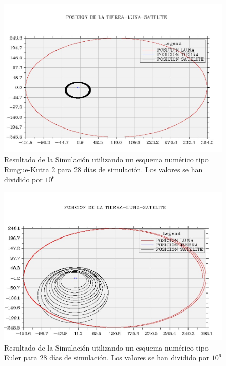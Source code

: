\documentclass[11pt,singlespacing,liststotoc,headsepline,a4paper]{article}
\begin{document}
\begin{figure}[H]
	\centering
	\includegraphics[width=1\textwidth]{TLS28D_RG2.jpg}
	\caption{Resultado de la Simulación utilizando un esquema numérico tipo Rungue-Kutta 2 para 28 días de simulación.  Los valores se han dividido por $10^{6}$}
	\label{TLS28D_RG2}
\end{figure}

\begin{figure}[H]
	\centering
	\includegraphics[width=1\textwidth]{TLS28D_EU.jpg}
	\caption{Resultado de la Simulación utilizando un esquema numérico tipo Euler para 28 días de simulación.  Los valores se han dividido por $10^{6}$}
	\label{TLS28D_EU}
\end{figure}
\end{document}
